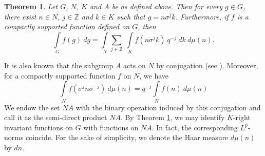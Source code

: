 \documentclass[12pt,reqno]{amsart}
\newtheorem{theorem}{Theorem}[section]
\theoremstyle{definition}
\theoremstyle{definition}
\numberwithin{equation}{section}
\begin{document}
\begin{theorem}\label{iwasawa}
Let $G$, $N$, $K$ and $A$ be as defined above. Then for every $g\in G$, there exist $n\in N$, $j\in\mathbb{Z}$ and $k\in K$ such that $g=n\sigma^{j}k$. Furthermore, if $f$ is a compactly supported function defined on $G$, then
	$$\int\limits_{G}f(g)~dg=\int\limits_{N}\sum\limits_{j\in\mathbb{Z}}~\int\limits_{K}f(n\sigma^{j}k)~q^{-j}~dk~d\mu(n).$$
\end{theorem}

It is also known that the subgroup $A$ acts on $N$ by conjugation (see \cite[Lemma 3.8]{Alessandro_2002}). Moreover, for a compactly supported function $f$ on $N$, we have
\begin{equation}\label{modularfunction}
\int\limits_{N}f(\sigma^{j}n\sigma^{-j})~d\mu(n)=q^{-j}\int\limits_{N}f(n)~d\mu(n)
\end{equation}
We endow the set $NA$ with the binary operation induced by this conjugation and call it as the semi-direct product $NA$. By Theorem \ref{iwasawa}, we may identify $K$-right invariant functions on $G$ with functions on $NA$. In fact, the corresponding $L^{p}$-norms coincide. For the sake of simplicity, we denote the Haar measure $d\mu(n)$ by $dn$. 
\end{document}
